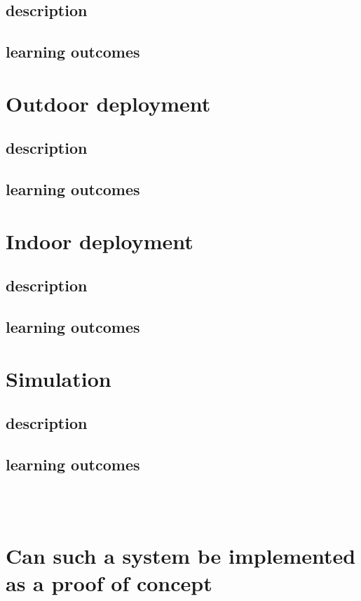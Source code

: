 \documentclass[]{uiophd}
\begin{document}
\subsection{description}
\subsection{learning outcomes}
\section{Outdoor deployment}
\subsection{description}
\subsection{learning outcomes}
\section{Indoor deployment}
\subsection{description}
\subsection{learning outcomes}
\section{Simulation}
\subsection{description}
\subsection{learning outcomes}

\\\\

\section{ Can such a system be implemented as a proof of concept}
\end{document}
